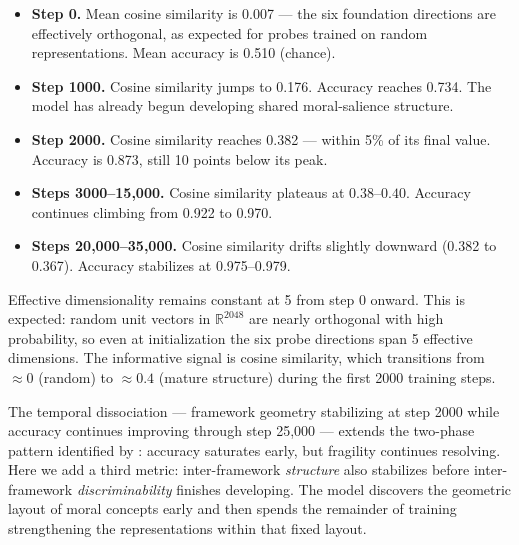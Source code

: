 \begin{itemize}
\item
  \textbf{Step 0.} Mean cosine similarity is 0.007 --- the six
  foundation directions are effectively orthogonal, as expected for
  probes trained on random representations. Mean accuracy is 0.510
  (chance).
\item
  \textbf{Step 1000.} Cosine similarity jumps to 0.176. Accuracy reaches
  0.734. The model has already begun developing shared moral-salience
  structure.
\item
  \textbf{Step 2000.} Cosine similarity reaches 0.382 --- within 5\% of
  its final value. Accuracy is 0.873, still 10 points below its
  peak.
\item
  \textbf{Steps 3000--15,000.} Cosine similarity plateaus at
  \(0.38\)--\(0.40\). Accuracy continues climbing from 0.922 to 0.970.
\item
  \textbf{Steps 20,000--35,000.} Cosine similarity drifts slightly
  downward (0.382 to 0.367). Accuracy stabilizes at 0.975--0.979.
\end{itemize}

Effective dimensionality remains constant at 5 from step 0 onward.
This is expected: random unit vectors in \(\mathbb{R}^{2048}\) are
nearly orthogonal with high probability, so even at initialization
the six probe directions span 5 effective dimensions. The
informative signal is cosine similarity, which transitions from
\(\approx 0\) (random) to \(\approx 0.4\) (mature structure) during the
first 2000 training steps.

The temporal dissociation --- framework geometry stabilizing at step
2000 while accuracy continues improving through step 25,000
--- extends the two-phase pattern identified by
\citet{reblitzrichardson2026fragility}: accuracy saturates early, but
fragility continues resolving. Here we add a third metric:
inter-framework \emph{structure} also stabilizes before inter-framework
\emph{discriminability} finishes developing. The model discovers the
geometric layout of moral concepts early and then spends the
remainder of training strengthening the representations within that
fixed layout.

